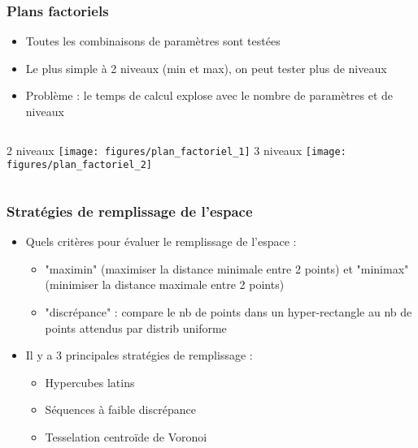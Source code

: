 \documentclass[10pt]{beamer}
\begin{document}
\begin{frame}
\frametitle{Plans factoriels}
\bigskip

\begin{itemize}
	\item Toutes les combinaisons de paramètres sont testées
	\item Le plus simple à 2 niveaux (min et max), on peut tester plus de niveaux
	\item Problème : le temps de calcul explose avec le nombre de paramètres et de niveaux
\end{itemize}

\begin{columns}
	2 niveaux
	\texttt{[image: figures/plan\_factoriel\_1]}
	3 niveaux
	\texttt{[image: figures/plan\_factoriel\_2]}
\end{columns}

\end{frame}

\begin{frame}
\frametitle{Stratégies de remplissage de l'espace}
\bigskip

\begin{itemize}
	\item Quels critères pour évaluer le remplissage de l'espace :
	\begin{itemize}
		\item "maximin" (maximiser la distance minimale entre 2 points) et "minimax" (minimiser la distance maximale entre 2 points)
		\item "discrépance" : compare le nb de points dans un hyper-rectangle au nb de points attendus par distrib uniforme
	\end{itemize}
	\item Il y a 3 principales stratégies de remplissage :
	\begin{itemize}
		\item Hypercubes latins
		\item Séquences à faible discrépance
		\item Tesselation centroïde de Voronoi
	\end{itemize}
\end{itemize}

\end{frame}
\end{document}
